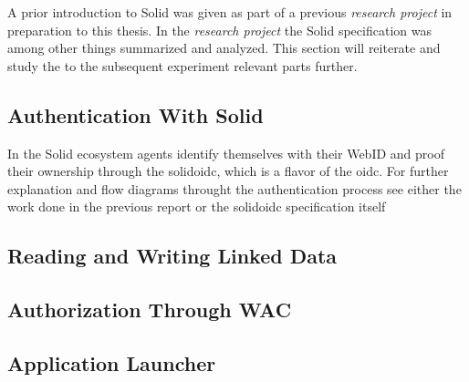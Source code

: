 A prior introduction to Solid was given as part of a previous \textit{research project} \cite{cern-solid-investigation-spec} in preparation to this thesis. In the \textit{research project} the Solid specification was among other things summarized and analyzed. This section will reiterate and study the to the subsequent experiment relevant parts further.

\subsection{Authentication With Solid}

In the Solid ecosystem agents identify themselves with their WebID and proof their ownership through the \gls{solidoidc}, which is a flavor of the \gls{oidc}. For further explanation and flow diagrams throught the authentication process see either the work done in the previous report \cite{cern-solid-investigation-spec} or the \gls{solidoidc} specification itself \cite{solid-ecosystem-oidc}

\subsection{Reading and Writing Linked Data}

\subsection{Authorization Through WAC}

\subsection{Application Launcher}
